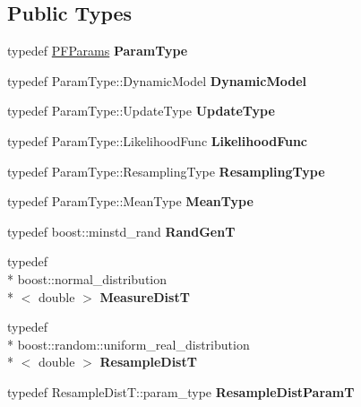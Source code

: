 \subsection*{Public Types}
\begin{DoxyCompactItemize}
\item 
\hypertarget{classPF_adfa1621d79550493fe72d3b5b7cf93e2}{typedef \hyperlink{structPFParams}{P\-F\-Params} {\bfseries Param\-Type}}\label{classPF_adfa1621d79550493fe72d3b5b7cf93e2}

\item 
\hypertarget{classPF_a7c640a7a7da160ed37155aa2b3e95deb}{typedef Param\-Type\-::\-Dynamic\-Model {\bfseries Dynamic\-Model}}\label{classPF_a7c640a7a7da160ed37155aa2b3e95deb}

\item 
\hypertarget{classPF_a98f04f8415eb0c52dfbdeab58ffdfff4}{typedef Param\-Type\-::\-Update\-Type {\bfseries Update\-Type}}\label{classPF_a98f04f8415eb0c52dfbdeab58ffdfff4}

\item 
\hypertarget{classPF_aaed645510028c6a8181098f9b8387740}{typedef Param\-Type\-::\-Likelihood\-Func {\bfseries Likelihood\-Func}}\label{classPF_aaed645510028c6a8181098f9b8387740}

\item 
\hypertarget{classPF_aab930e8a4212bbce4b13bdc3c5888300}{typedef Param\-Type\-::\-Resampling\-Type {\bfseries Resampling\-Type}}\label{classPF_aab930e8a4212bbce4b13bdc3c5888300}

\item 
\hypertarget{classPF_aab0c118f61d501c61634d5050aae2f46}{typedef Param\-Type\-::\-Mean\-Type {\bfseries Mean\-Type}}\label{classPF_aab0c118f61d501c61634d5050aae2f46}

\item 
\hypertarget{classPF_a382af3d246a90a66076a4efdc235d89c}{typedef boost\-::minstd\-\_\-rand {\bfseries Rand\-Gen\-T}}\label{classPF_a382af3d246a90a66076a4efdc235d89c}

\item 
\hypertarget{classPF_a71a107ea3b77e8e26534cedbc11b4073}{typedef \\*
boost\-::normal\-\_\-distribution\\*
$<$ double $>$ {\bfseries Measure\-Dist\-T}}\label{classPF_a71a107ea3b77e8e26534cedbc11b4073}

\item 
\hypertarget{classPF_a6cde28711c6921b6d80215f50a24347c}{typedef \\*
boost\-::random\-::uniform\-\_\-real\-\_\-distribution\\*
$<$ double $>$ {\bfseries Resample\-Dist\-T}}\label{classPF_a6cde28711c6921b6d80215f50a24347c}

\item 
\hypertarget{classPF_a4a638ee525cf888d70d463768017a8d9}{typedef Resample\-Dist\-T\-::param\-\_\-type {\bfseries Resample\-Dist\-Param\-T}}\label{classPF_a4a638ee525cf888d70d463768017a8d9}

\end{DoxyCompactItemize}
